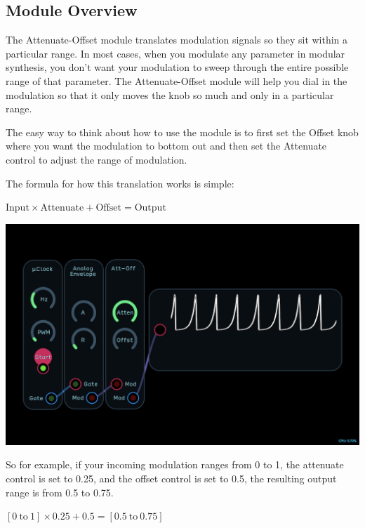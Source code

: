 \documentclass[11pt]{book}
\begin{document}
\begin{multicols*}{2}

\subsection*{Module Overview}

The Attenuate-Offset module translates modulation signals so they sit within a particular range. In most cases, when you modulate any parameter in modular synthesis, you don't want your modulation to sweep through the entire possible range of that parameter. The Attenuate-Offset module will help you dial in the modulation so that it only moves the knob so much and only in a particular range.

The easy way to think about how to use the module is to first set the Offset knob where you want the modulation to bottom out and then set the Attenuate control to adjust the range of modulation.

The formula for how this translation works is simple: 

\begin{center}
	$\textrm{Input} \times \textrm{Attenuate} + \textrm{Offset} = \textrm{Output}$ 
\end{center}

\begin{center}
\includegraphics[width=0.95\linewidth]{attenuate-offset-fig1.png}
\end{center}

So for example, if your incoming modulation ranges from 0 to 1, the attenuate control is set to 0.25, and the offset control is set to 0.5, the resulting output range is from 0.5 to 0.75.

\begin{center}
	$[0 \ \textrm{to} \ 1] \times 0.25+0.5=[0.5 \ \textrm{to} \ 0.75]$ 
\end{center}


\end{multicols*}
\end{document}
